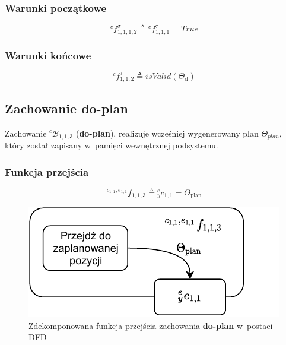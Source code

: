 \subsubsection{Warunki początkowe}
\begin{equation}
    {}^{c}f^{\sigma}_{1,1,1,2} \triangleq {}^{c}f^{\tau}_{1,1,1} = True
\end{equation}

\subsubsection{Warunki końcowe}
\begin{equation}
    {}^{c}f^{\tau}_{1,1,2} \triangleq isValid(\Theta_{\mathrm{d}})
\end{equation}



\subsection{Zachowanie do-plan}
\label{subsec:cs-do-plan}
Zachowanie ${}^{c}\mathcal{B}_{1,1,3}$ (\textbf{do-plan}), realizuje wcześniej wygenerowany plan $\Theta_{plan}$, który został zapisany w~pamięci wewnętrznej podsystemu.

\subsubsection{Funkcja przejścia}
\begin{equation}
    {}^{c_{1,1}, e_{1,1}}f_{1,1,3} \triangleq {}^{e}_{y}c_{1,1} = \Theta_{\mathrm{plan}}
\end{equation}

\begin{figure}[H]
    \centering
    \includegraphics[width=\columnwidth]{figures/ISR-cs-fp-do-plan.pdf}
    \caption{Zdekomponowana funkcja przejścia zachowania \textbf{do-plan} w~postaci DFD}
    \label{fig:cs-fp-do-plan}
\end{figure}

